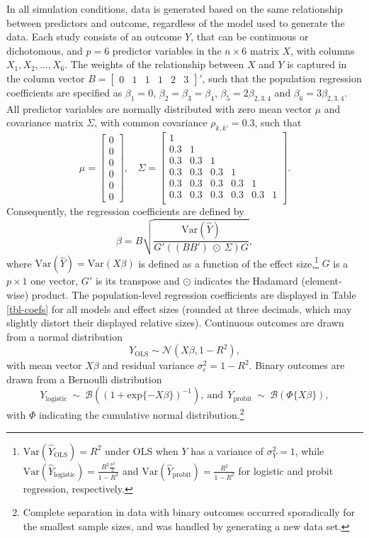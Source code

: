 \documentclass[
  authoryear,
  preprint,
  5p,
  twocolumn]{elsarticle}
\begin{document}
In all simulation conditions, data is generated based on the same
relationship between predictors and outcome, regardless of the model
used to generate the data. Each study consists of an outcome \(Y\), that
can be continuous or dichotomous, and \(p = 6\) predictor variables in
the \(n \times 6\) matrix \(X\), with columns \(X_1, X_2, \dots, X_6\).
The weights of the relationship between \(X\) and \(Y\) is captured in
the column vector
\(B = \begin{bmatrix} 0 & 1 & 1 & 1 & 2 & 3 \end{bmatrix}'\), such that
the population regression coefficients are specified as \(\beta_1 = 0\),
\(\beta_2 = \beta_3 = \beta_4\), \(\beta_5 = 2\beta_{2,3,4}\) and
\(\beta_6 = 3\beta_{2,3,4}\). All predictor variables are normally
distributed with zero mean vector \(\mu\) and covariance matrix
\(\Sigma\), with common covariance \(\rho_{k,k'}=0.3\), such that \[
\mu = 
\begin{bmatrix}
0 \\ 0 \\ 0 \\ 0 \\ 0 \\ 0
\end{bmatrix}, 
~~~~
\Sigma = 
\begin{bmatrix}
1 &  &  &  &  &  \\ 
0.3 & 1 &  &  &  &  \\ 
0.3 & 0.3 & 1 &  &  &  \\ 
0.3 & 0.3 & 0.3 & 1 &  &  \\ 
0.3 & 0.3 & 0.3 & 0.3 & 1 &  \\ 
0.3 & 0.3 & 0.3 & 0.3 & 0.3 & 1  \\ 
\end{bmatrix}.
\] Consequently, the regression coefficients are defined by \[
\beta = B 
  \sqrt{
    \frac{\text{Var}(\hat{Y})}{G'((BB')~\odot~\Sigma)G}
  },
\] where \(\text{Var}(\hat{Y}) = \text{Var}(X\beta)\) is defined as a
function of the effect size,\footnote{
  \(\text{Var}(\hat{Y}_{\text{OLS}}) = R^2\) under OLS when \(Y\) has a
  variance of \(\sigma_Y^2 = 1\), while
  \(\text{Var}(\hat{Y}_{\text{logistic}}) = \frac{R^2\frac{\pi^2}{3}}{1 - R^2}\)
  and \(\text{Var}(\hat{Y}_{\text{probit}}) = \frac{R^2}{1-R^2}\) for
  logistic and probit regression, respectively.} \(G\) is a
\(p \times 1\) one vector, \(G'\) is its transpose and \(\odot\)
indicates the Hadamard (element-wise) product. The population-level
regression coefficients are displayed in Table \ref{tbl-coefs} for all
models and effect sizes (rounded at three decimals, which may slightly
distort their displayed relative sizes). Continuous outcomes are drawn
from a normal distribution \[
Y_{\text{OLS}} \sim \mathcal{N}(X\beta, 1 - R^2),
\] with mean vector \(X\beta\) and residual variance
\(\sigma_{\epsilon}^2=1-R^2\). Binary outcomes are drawn from a
Bernoulli distribution \[
Y_{\text{logistic}} ~ \sim ~ \mathcal{B}((1 + \text{exp}\{-X\beta\})^{-1}), 
~ \text{and} ~~
Y_{\text{probit}} ~ \sim ~ \mathcal{B}(\Phi\{X\beta\}),
\] with \(\Phi\) indicating the cumulative normal
distribution.\footnote{Complete separation in data with binary outcomes
  occurred sporadically for the smallest sample sizes, and was handled
  by generating a new data set.}
\end{document}
